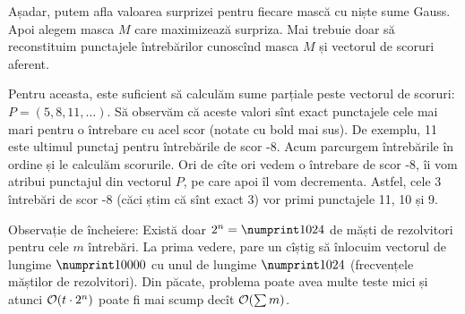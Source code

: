 \documentclass[../main.tex]{subfiles}
\begin{document}
Așadar, putem afla valoarea surprizei pentru fiecare mască cu niște sume Gauss. Apoi alegem masca $M$ care maximizează surpriza. Mai trebuie doar să reconstituim punctajele întrebărilor cunoscînd masca $M$ și vectorul de scoruri aferent.

Pentru aceasta, este suficient să calculăm sume parțiale peste vectorul de scoruri: $P=(5, 8, 11, \dots)$. Să observăm că aceste valori sînt exact punctajele cele mai mari pentru o întrebare cu acel scor (notate cu bold mai sus). De exemplu, 11 este ultimul punctaj pentru întrebările de scor -8. Acum parcurgem întrebările în ordine și le calculăm scorurile. Ori de cîte ori vedem o întrebare de scor -8, îi vom atribui punctajul din vectorul $P$, pe care apoi îl vom decrementa. Astfel, cele 3 întrebări de scor -8 (căci știm că sînt exact 3) vor primi punctajele 11, 10 și 9.

Observație de încheiere: Există doar $2^n = \np{1024}$ de măști de rezolvitori pentru cele $m$ întrebări. La prima vedere, pare un cîștig să înlocuim vectorul de lungime $\np{10000}$ cu unul de lungime $\np{1024}$ (frecvențele măștilor de rezolvitori). Din păcate, problema poate avea multe teste mici și atunci $\mathcal{O}(t \cdot 2^n)$ poate fi mai scump decît $\mathcal{O}(\sum m)$.
\end{document}
